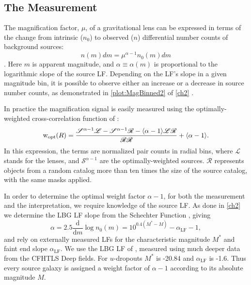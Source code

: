 \subsection{The Measurement}

The magnification factor, $\mu$, of a gravitational lens can be expressed in terms of the change from intrinsic ($n_0$) to observed ($n$) differential number counts of background sources:
\begin{equation}
n(m)dm = \mu^{\alpha-1} n_0(m)dm 
\end{equation}
\citep{Narayan89}. Here $m$ is apparent magnitude, and $\alpha \equiv \alpha(m)$ is proportional to the logarithmic slope of the source \ac{LF}. Depending on the \ac{LF}'s slope in a given magnitude bin, it is possible to observe either an increase or a decrease in source number counts, as demonstrated in \autoref{plot:MagBinned2} of \autoref{ch2} \citep[equivalently, Figure 2 of][]{Ford12}. 

In practice the magnification signal is easily measured using the optimally-weighted cross-correlation function of \citet{Menard03}:
\begin{equation}
\mathrm{w}_{\rm opt}(R)=\frac{\mathscr{S}^{\alpha-1} \mathscr{L} - \mathscr{S}^{\alpha-1} \mathscr{R} - \langle \alpha-1 \rangle \mathscr{L}\mathscr{R}}{\mathscr{R}\mathscr{R}} + \langle \alpha-1 \rangle .
\end{equation}
In this expression, the terms are normalized pair counts in radial bins, where $\mathscr{L}$ stands for the lenses, and $\mathscr{S}^{\alpha-1}$ are the optimally-weighted sources. $\mathscr{R}$ represents objects from a random catalog more than ten times the size of the source catalog, with the same masks applied.

In order to determine the optimal weight factor $\alpha-1$, for both the measurement and the interpretation, we require knowledge of the source \ac{LF}. As done in \autoref{ch2} \citep{Ford12} we determine the \ac{LBG} \ac{LF} slope from the Schechter Function \citep{Schechter76}, giving
\begin{equation}
\alpha = 2.5 \frac{\mathrm{d}}{\mathrm{d}m}\log n_0(m) = 10^{0.4(M^\ast-M)}-\alpha_{\mathrm{LF}}-1,
\end{equation}
and rely on externally measured \ac{LF}s for the characteristic magnitude $M^\ast$ and faint end slope $\alpha_{\mathrm{LF}}$. We use the \ac{LBG} \ac{LF} of \citet{vanderBurg10}, measured using much deeper data from the \ac{CFHTLS} Deep fields. For $u$-dropouts $M^\ast$ is -20.84 and $\alpha_{\mathrm{LF}}$ is -1.6. Thus every source galaxy is assigned a weight factor of $\alpha-1$ according to its absolute magnitude $M$.


